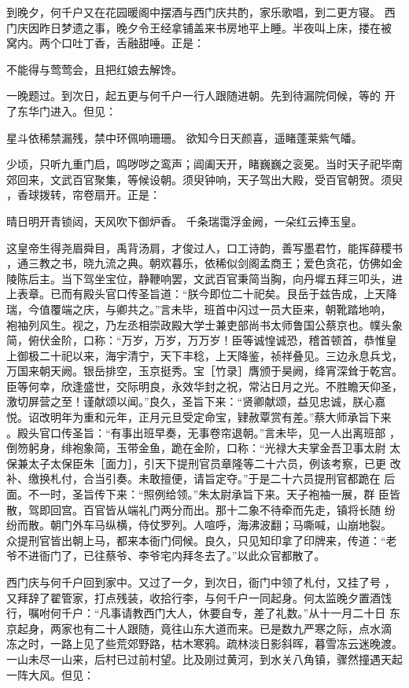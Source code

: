 到晚夕，何千户又在花园暖阁中摆酒与西门庆共酌，家乐歌唱，到二更方寝。
西门庆因昨日梦遗之事，晚夕令王经拿铺盖来书房地平上睡。半夜叫上床，搂在被
窝内。两个口吐丁香，舌融甜唾。正是：

不能得与莺莺会，且把红娘去解馋。

一晚题过。到次日，起五更与何千户一行人跟随进朝。先到待漏院伺候，等的
开了东华门进入。但见：

星斗依稀禁漏残，禁中环佩响珊珊。
欲知今日天颜喜，遥睹蓬莱紫气皤。

少顷，只听九重门启，鸣哕哕之鸾声；阊阖天开，睹巍巍之衮冕。当时天子祀毕南
郊回来，文武百官聚集，等候设朝。须臾钟响，天子驾出大殿，受百官朝贺。须臾
，香球拨转，帘卷扇开。正是：

晴日明开青锁闼，天风吹下御炉香。
千条瑞霭浮金阙，一朵红云捧玉皇。

这皇帝生得尧眉舜目，禹背汤肩，才俊过人，口工诗韵，善写墨君竹，能挥薛稷书
，通三教之书，晓九流之典。朝欢暮乐，依稀似剑阁孟商王；爱色贪花，仿佛如金
陵陈后主。当下驾坐宝位，静鞭响罢，文武百官秉简当胸，向丹墀五拜三叩头，进
上表章。已而有殿头官口传圣旨道：“朕今即位二十祀矣。艮岳于兹告成，上天降
瑞，今值覆端之庆，与卿共之。”言未毕，班首中闪过一员大臣来，朝靴踏地响，
袍袖列风生。视之，乃左丞相崇政殿大学士兼吏部尚书太师鲁国公蔡京也。幞头象
简，俯伏金阶，口称：“万岁，万岁，万万岁！臣等诚惶诚恐，稽首顿首，恭惟皇
上御极二十祀以来，海宇清宁，天下丰稔，上天降鉴，祯祥叠见。三边永息兵戈，
万国来朝天阙。银岳排空，玉京挺秀。宝［竹录］膺颁于昊阙，绛宵深耸于乾宫。
臣等何幸，欣逢盛世，交际明良，永效华封之祝，常沾日月之光。不胜瞻天仰圣，
激切屏营之至！谨献颂以闻。”良久，圣旨下来：“贤卿献颂，益见忠诚，朕心嘉
悦。诏改明年为重和元年，正月元旦受定命宝，肄赦覃赏有差。”蔡大师承旨下来
。殿头官口传圣旨：“有事出班早奏，无事卷帘退朝。”言未毕，见一人出离班部
，倒笏躬身，绯袍象简，玉带金鱼，跪在金阶，口称：“光禄大夫掌金吾卫事太尉
太保兼太子太保臣朱［面力］，引天下提刑官员章隆等二十六员，例该考察，已更
改补、缴换札付，合当引奏。未敢擅便，请旨定夺。”于是二十六员提刑官都跪在
后面。不一时，圣旨传下来：“照例给领。”朱太尉承旨下来。天子袍袖一展，群
臣皆散，驾即回宫。百官皆从端礼门两分而出。那十二象不待牵而先走，镇将长随
纷纷而散。朝门外车马纵横，侍仗罗列。人喧呼，海沸波翻；马嘶喊，山崩地裂。
众提刑官皆出朝上马，都来本衙门伺候。良久，只见知印拿了印牌来，传道：“老
爷不进衙门了，已往蔡爷、李爷宅内拜冬去了。”以此众官都散了。

西门庆与何千户回到家中。又过了一夕，到次日，衙门中领了札付，又挂了号
，又拜辞了翟管家，打点残装，收拾行李，与何千户一同起身。何太监晚夕置酒饯
行，嘱咐何千户：“凡事请教西门大人，休要自专，差了礼数。”从十一月二十日
东京起身，两家也有二十人跟随，竟往山东大道而来。已是数九严寒之际，点水滴
冻之时，一路上见了些荒郊野路，枯木寒鸦。疏林淡日影斜晖，暮雪冻云迷晚渡。
一山未尽一山来，后村已过前村望。比及刚过黄河，到水关八角镇，骤然撞遇天起
一阵大风。但见：


